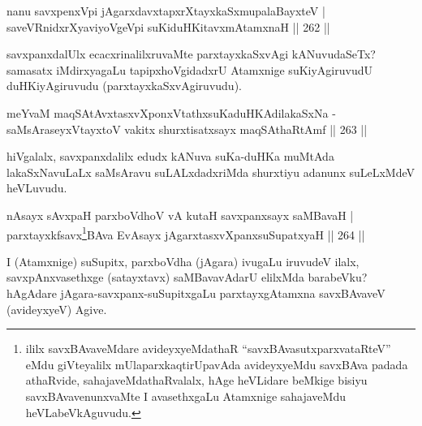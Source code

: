 
\begin{shl}
nanu savxpenxV\s pi jAgarxdavxtapxrXtayxkaSxmupalaBayxteV |\\
saveVRnidxrXyaviyoVgeV\s pi suKiduHKitavxmAtamxnaH \hfill || 262 ||
\end{shl}

\begin{artha}
savxpanxdalUlx ecacxrinalilxruvaMte parxtayxkaSxvAgi kANuvudaSeTx? samasatx iMdirxyagaLu tapipxhoVgidadxrU Atamxnige suKiyAgiruvudU duHKiyAgiruvudu (parxtayxkaSxvAgiruvudu).
\end{artha}


\begin{shl}
meYvaM maqSAtAvxtasxvXponxVtathxsuKaduHKAdilakaSxNa -\\
saMsAraseyxVtayxtoV vakitx shurxtisatxsayx maqSAthaRtAmf \hfill || 263 ||
\end{shl}

\begin{artha}
hiVgalalx, savxpanxdalilx edudx kANuva suKa-duHKa muMtAda lakaSxNavuLaLx saMsAravu suLALxdadxriMda shurxtiyu adanunx suLeLxMdeV heVLuvudu.
\end{artha}


\begin{shl}
nAsayx sAvxpaH parxboVdhoV vA kutaH savxpanxsayx saMBavaH |\\
parxtayxkfsavx\footnote{ililx savxBAvaveMdare avideyxyeMdathaR ``savxBAvasutxparxvataRteV'' eMdu giVteyalilx mUlaparxkaqtirUpavAda avideyxyeMdu savxBAva padada athaRvide, sahajaveMdathaRvalalx, hAge heVLidare beMkige bisiyu savxBAvavenunxvaMte I avasethxgaLu Atamxnige sahajaveMdu heVLabeVkAguvudu.}BAva EvAsayx jAgarxtasxvXpanxsuSupatxyaH \hfill || 264 ||
\end{shl}

\begin{artha}
I (Atamxnige) suSupitx, parxboVdha (jAgara) ivugaLu iruvudeV ilalx, savxpAnxvasethxge (satayxtavx) saMBavavAdarU elilxMda barabeVku? hAgAdare jAgara-savxpanx-suSupitxgaLu parxtayxgAtamxna savxBAvaveV (avideyxyeV) Agive.
\end{artha}



